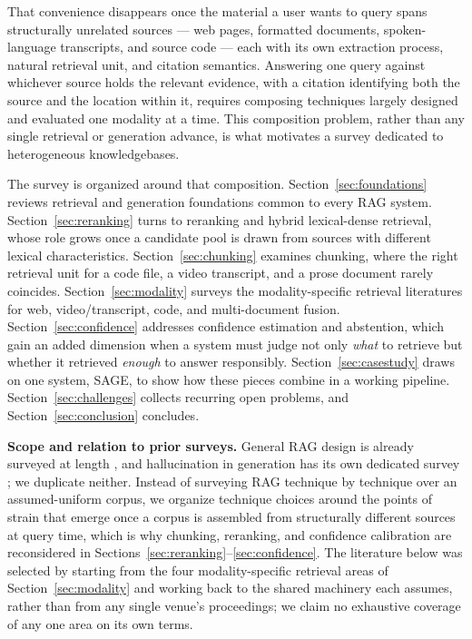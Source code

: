 \documentclass[conference]{IEEEtran}
\begin{document}
That convenience disappears once the material a user wants to query spans structurally unrelated sources — web pages, formatted documents, spoken-language transcripts, and source code — each with its own extraction process, natural retrieval unit, and citation semantics. Answering one query against whichever source holds the relevant evidence, with a citation identifying both the source and the location within it, requires composing techniques largely designed and evaluated one modality at a time. This composition problem, rather than any single retrieval or generation advance, is what motivates a survey dedicated to heterogeneous knowledgebases.

The survey is organized around that composition. Section~\ref{sec:foundations} reviews retrieval and generation foundations common to every RAG system. Section~\ref{sec:reranking} turns to reranking and hybrid lexical-dense retrieval, whose role grows once a candidate pool is drawn from sources with different lexical characteristics. Section~\ref{sec:chunking} examines chunking, where the right retrieval unit for a code file, a video transcript, and a prose document rarely coincides. Section~\ref{sec:modality} surveys the modality-specific retrieval literatures for web, video/transcript, code, and multi-document fusion. Section~\ref{sec:confidence} addresses confidence estimation and abstention, which gain an added dimension when a system must judge not only \emph{what} to retrieve but whether it retrieved \emph{enough} to answer responsibly. Section~\ref{sec:casestudy} draws on one system, SAGE, to show how these pieces combine in a working pipeline. Section~\ref{sec:challenges} collects recurring open problems, and Section~\ref{sec:conclusion} concludes.

\textbf{Scope and relation to prior surveys.} General RAG design is already surveyed at length \cite{gao2023ragsurvey}, and hallucination in generation has its own dedicated survey \cite{ji2023hallucination}; we duplicate neither. Instead of surveying RAG technique by technique over an assumed-uniform corpus, we organize technique choices around the points of strain that emerge once a corpus is assembled from structurally different sources at query time, which is why chunking, reranking, and confidence calibration are reconsidered in Sections~\ref{sec:reranking}--\ref{sec:confidence}. The literature below was selected by starting from the four modality-specific retrieval areas of Section~\ref{sec:modality} and working back to the shared machinery each assumes, rather than from any single venue's proceedings; we claim no exhaustive coverage of any one area on its own terms.
\end{document}
